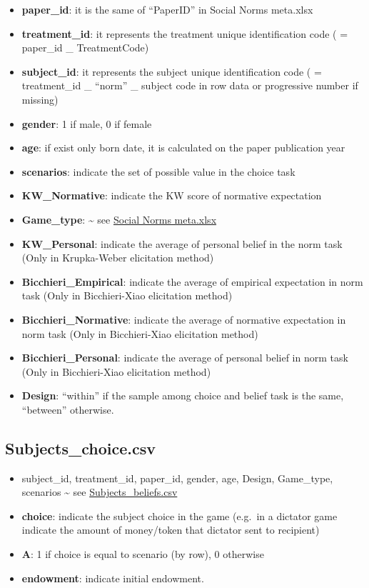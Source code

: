 \documentclass[
]{article}
\providecommand{\tightlist}{%
  \setlength{\itemsep}{0pt}\setlength{\parskip}{0pt}}
\begin{document}
\begin{itemize}
\tightlist
\item
  \textbf{paper\_id}: it is the same of ``PaperID'' in Social Norms
  meta.xlsx
\item
  \textbf{treatment\_id}: it represents the treatment unique
  identification code ( = paper\_id \_ TreatmentCode)
\item
  \textbf{subject\_id}: it represents the subject unique identification
  code ( = treatment\_id \_ ``norm'' \_ subject code in row data or
  progressive number if missing)
\item
  \textbf{gender}: 1 if male, 0 if female
\item
  \textbf{age}: if exist only born date, it is calculated on the paper
  publication year
\item
  \textbf{scenarios}: indicate the set of possible value in the choice
  task
\item
  \textbf{KW\_Normative}: indicate the KW score of normative expectation
\item
  \textbf{Game\_type}: \textasciitilde{} see
  \protect\hyperlink{Study_identifiers}{Social Norms meta.xlsx}
\item
  \textbf{KW\_Personal}: indicate the average of personal belief in the
  norm task (Only in Krupka-Weber elicitation method)
\item
  \textbf{Bicchieri\_Empirical}: indicate the average of empirical
  expectation in norm task (Only in Bicchieri-Xiao elicitation method)
\item
  \textbf{Bicchieri\_Normative}: indicate the average of normative
  expectation in norm task (Only in Bicchieri-Xiao elicitation method)
\item
  \textbf{Bicchieri\_Personal}: indicate the average of personal belief
  in norm task (Only in Bicchieri-Xiao elicitation method)
\item
  \textbf{Design}: ``within'' if the sample among choice and belief task
  is the same, ``between'' otherwise.
\end{itemize}

\hypertarget{subjects_choice.csv}{%
\subsection{Subjects\_choice.csv}\label{subjects_choice.csv}}

\begin{itemize}
\tightlist
\item
  subject\_id, treatment\_id, paper\_id, gender, age, Design,
  Game\_type, scenarios \textasciitilde{} see
  \protect\hyperlink{beliefs}{Subjects\_beliefs.csv}
\item
  \textbf{choice}: indicate the subject choice in the game (e.g.~in a
  dictator game indicate the amount of money/token that dictator sent to
  recipient)
\item
  \textbf{A}: 1 if choice is equal to scenario (by row), 0 otherwise
\item
  \textbf{endowment}: indicate initial endowment.
\end{itemize}
\end{document}
